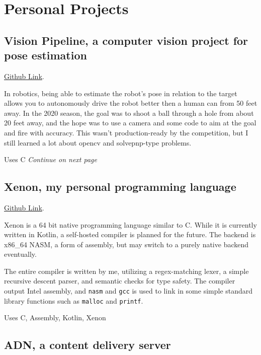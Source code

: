 \documentclass[10pt,letterpaper]{article}
\def\link#1#2{\color{blue!60!black}\href{#1}{#2}\color{black}}
\newcommand{\CPP}
{C\nolinebreak[4]\hspace{-.05em}\raisebox{.35ex}{\footnotesize\bf ++}}
\def\code#1{\texttt{#1}}
\begin{document}
    \section*{Personal Projects}

    \subsection*{Vision Pipeline, a computer vision project for pose estimation}
    \link{https://github.com/CougarProgramming623/vision-pipeline}{Github Link}. 
    
    In robotics, being able to estimate the robot's pose in relation to the target
    allows you to autonomously drive the robot better then a human can from 50 feet away.
    In the 2020 season, the goal was to shoot a ball through a hole from about 20 feet away,
    and the hope was to use a camera and some code to aim at the goal and fire with accuracy.
    This wasn't production-ready by the competition,
    but I still learned a lot about opencv and solvepnp-type problems. 

    \vspace{0.5em}
    \noindent Uses \CPP
    \hspace*{0pt}\hfill\textit{Continue on next page}

    \subsection*{Xenon, my personal programming language}
    \link{https://github.com/Mee42/Xenon}{Github Link}.
    
    Xenon is a 64 bit native programming language similar to C.
    While it is currently written in Kotlin, a self-hosted compiler is planned for the future.
    The backend is x86\_64 NASM, a form of assembly,
    but may switch to a purely native backend eventually.
    
    The entire compiler is written by me, utilizing a regex-matching lexer, 
    a simple recursive descent parser,
    and semantic checks for type safety.
    The compiler output Intel assembly,
    and \code{nasm} and \code{gcc} is used to link in some simple standard library functions such as
    \code{malloc} and \code{printf}.
    
    \vspace{0.5em}
    \noindent Uses C, Assembly, Kotlin, Xenon

    \subsection*{ADN, a content delivery server}
    
\end{document}
